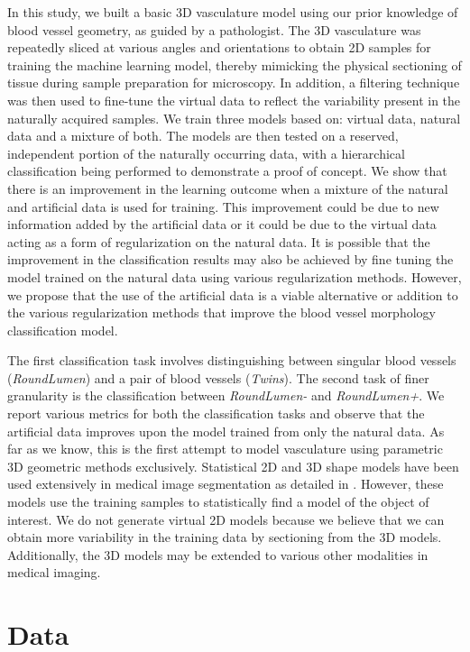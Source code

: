 In this study, we built a basic 3D vasculature model using our prior knowledge of blood vessel geometry, as guided by a pathologist. The 3D vasculature was repeatedly sliced at various angles and orientations to obtain 2D samples for training the machine learning model, thereby mimicking the physical sectioning of tissue during sample preparation for microscopy. In addition, a filtering technique was then used to fine-tune the virtual data to reflect the variability present in the naturally acquired samples. We train three models based on: virtual data, natural data and a mixture of both. The models are then tested on a reserved, independent portion of the naturally occurring data, with a hierarchical classification being performed to demonstrate a proof of concept. We show that there is an improvement in the learning outcome when a mixture of the natural and artificial data is used for training. This improvement could be due to new information added by the artificial data or it could be due to the virtual data acting as a form of regularization on the natural data. It is possible that the improvement in the classification results may also be achieved by fine tuning the model trained on the natural data using various regularization methods. However, we propose that the use of the artificial data is a viable alternative or addition to the various regularization methods that improve the blood vessel morphology classification model.

The first classification task involves distinguishing between singular blood vessels (\textit{RoundLumen}) and a pair of blood vessels (\textit{Twins}). The second task of finer granularity is the classification between \textit{RoundLumen-} and \textit{RoundLumen+}. We report various metrics for both the classification tasks and observe that the artificial data improves upon the model trained from only the natural data.
As far as we know, this is the first attempt to model vasculature using parametric 3D geometric methods exclusively. Statistical 2D and 3D shape models have been used extensively in medical image segmentation as detailed in \cite{heimann2009statistical}. However, these models use the training samples to statistically find a model of the object of interest. We do not generate virtual 2D models because we believe that we can obtain more variability in the training data by sectioning from the 3D models. Additionally, the 3D models may be extended to various other modalities in medical imaging. 

\section{Data}

